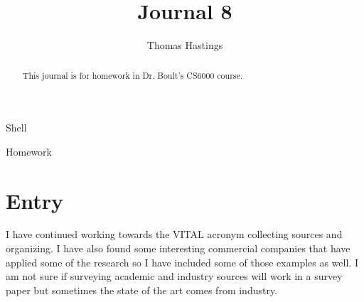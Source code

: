 \documentclass[journal]{IEEEtran}
\begin{document}
  \title{Journal 8}
  \author{Thomas Hastings}%
  
  {Shell}
  \maketitle
  
  \begin{abstract}
  This journal is for homework in Dr. Boult's CS6000 course.
  \end{abstract}
  
  \begin{IEEEkeywords}
  Homework
  \end{IEEEkeywords}
  
  
  \section{Entry}
 I have continued working towards the VITAL acronym collecting sources and organizing. I have also found some interesting commercial companies that have applied some of the research so I have included some of those examples as well. I am not sure if surveying academic and industry sources will work in a survey paper but sometimes the state of the art comes from industry. 
  
  
\end{document}
